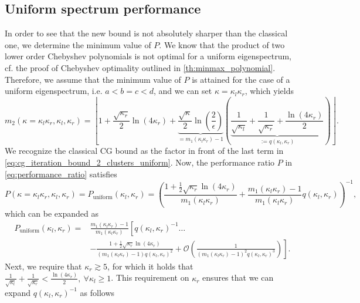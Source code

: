 \subsection{Uniform spectrum performance}\label{sec:cg_sharpened_convrate_uniform_performance}
In order to see that the new bound is not absolutely sharper than the classical one, we determine the minimum value of $P$. We know that the product of two lower order Chebyshev polynomials is not optimal for a uniform eigenspectrum, cf. the proof of Chebyshev optimality outlined in \cref{th:minmax_polynomial}. Therefore, we assume that the minimum value of $P$ is attained for the case of a uniform eigenspectrum, i.e. $a<b=c<d$, and we can set $\kappa=\kappa_l\kappa_r$, which yields
\begin{equation}
    m_2(\kappa=\kappa_l\kappa_r, \kappa_l, \kappa_r)=\left\lfloor
    1
    + \frac{\sqrt{\kappa_r}}{2}\ln\left(4\kappa_r\right)
    + \underbrace{\frac{\sqrt{\kappa}}{2}\ln\left(\frac{2}{\epsilon}\right)}_{=m_1(\kappa_l\kappa_r)-1}\left(
    \underbrace{
            \frac{1}{\sqrt{\kappa_l}}
            + \frac{1}{\sqrt{\kappa_r}}
            + \frac{\ln\left(4\kappa_r\right)}{2}
        }_{:= q(\kappa_l, \kappa_r)}
    \right)
    \right\rfloor.
    \label{eq:cg_iteration_bound_2_clusters_uniform}
\end{equation}
We recognize the classical CG bound as the factor in front of the last term in \cref{eq:cg_iteration_bound_2_clusters_uniform}. Now, the performance ratio $P$ in \cref{eq:performance_ratio} satisfies
\begin{equation}
    P(\kappa=\kappa_l\kappa_r, \kappa_l, \kappa_r) = P_{\text{uniform}}(\kappa_l, \kappa_r) = \left(\frac{1 + \frac{1}{2}\sqrt{\kappa_r}\ln(4\kappa_r)}{m_1(\kappa_l\kappa_r)} + \frac{m_1(\kappa_l\kappa_r)-1}{m_1(\kappa_l\kappa_r)}q(\kappa_l, \kappa_r)\right)^{-1},
    \label{eq:performance_ratio_uniform}
\end{equation}
which can be expanded as
\begin{align*}
    P_{\text{uniform}}(\kappa_l, \kappa_r) = &\frac{m_1(\kappa_l\kappa_r)-1}{m_1(\kappa_l\kappa_r)}\left[ q(\kappa_l, \kappa_r)^{-1}\ldots\right.\\
    &\left.-\frac{1 + \frac{1}{2}\sqrt{\kappa_r}\ln(4\kappa_r)}{(m_1(\kappa_l\kappa_r)-1)q(\kappa_l, \kappa_r)^2} + \mathcal{O}\left(\frac{1}{(m_1(\kappa_l\kappa_r)-1)^2q(\kappa_l, \kappa_r)^3}\right)\right].
\end{align*}
Next, we require that $\kappa_r \gtrsim 5$, for which it holds that $\frac{1}{\sqrt{\kappa_l}} + \frac{1}{\sqrt{\kappa_r}} < \frac{\ln\left(4\kappa_r\right)}{2}, \ \forall \kappa_l \geq 1$. This requirement on $\kappa_r$ ensures that we can expand $q(\kappa_l, \kappa_r)^{-1}$ as follows
